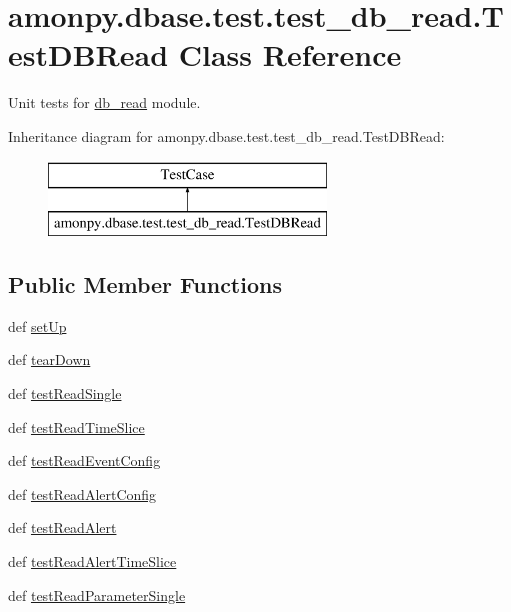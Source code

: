 \hypertarget{classamonpy_1_1dbase_1_1test_1_1test__db__read_1_1_test_d_b_read}{\section{amonpy.\-dbase.\-test.\-test\-\_\-db\-\_\-read.\-Test\-D\-B\-Read Class Reference}
\label{classamonpy_1_1dbase_1_1test_1_1test__db__read_1_1_test_d_b_read}
}


Unit tests for \hyperlink{namespaceamonpy_1_1dbase_1_1db__read}{db\-\_\-read} module.  


Inheritance diagram for amonpy.\-dbase.\-test.\-test\-\_\-db\-\_\-read.\-Test\-D\-B\-Read\-:\begin{figure}[H]
\begin{center}
\leavevmode
\includegraphics[height=2.000000cm]{df/d87/classamonpy_1_1dbase_1_1test_1_1test__db__read_1_1_test_d_b_read}
\end{center}
\end{figure}
\subsection*{Public Member Functions}
\begin{DoxyCompactItemize}
\item 
def \hyperlink{classamonpy_1_1dbase_1_1test_1_1test__db__read_1_1_test_d_b_read_a3d42ef1ed1ec53504c475d0db682fc1e}{set\-Up}
\item 
def \hyperlink{classamonpy_1_1dbase_1_1test_1_1test__db__read_1_1_test_d_b_read_a5e6de8d1c39f5c64ac66b5329d7803ba}{tear\-Down}
\item 
def \hyperlink{classamonpy_1_1dbase_1_1test_1_1test__db__read_1_1_test_d_b_read_a8eef1ba4193c4b630467e5cc4356e326}{test\-Read\-Single}
\item 
def \hyperlink{classamonpy_1_1dbase_1_1test_1_1test__db__read_1_1_test_d_b_read_af5b8a121cd312c79b9a96f14225895cd}{test\-Read\-Time\-Slice}
\item 
def \hyperlink{classamonpy_1_1dbase_1_1test_1_1test__db__read_1_1_test_d_b_read_ad58e247d7332ccd18c21296b68ef3944}{test\-Read\-Event\-Config}
\item 
def \hyperlink{classamonpy_1_1dbase_1_1test_1_1test__db__read_1_1_test_d_b_read_a88bf26659e5ad77f96e49347e527ea1c}{test\-Read\-Alert\-Config}
\item 
def \hyperlink{classamonpy_1_1dbase_1_1test_1_1test__db__read_1_1_test_d_b_read_a9e83f573f0f9825c75e585d2e6707283}{test\-Read\-Alert}
\item 
def \hyperlink{classamonpy_1_1dbase_1_1test_1_1test__db__read_1_1_test_d_b_read_a521e28d6ad16e03b0a6ad6cbfe06f725}{test\-Read\-Alert\-Time\-Slice}
\item 
def \hyperlink{classamonpy_1_1dbase_1_1test_1_1test__db__read_1_1_test_d_b_read_a21c5b2538f4d5adee20f64bc377d7905}{test\-Read\-Parameter\-Single}
\end{DoxyCompactItemize}
